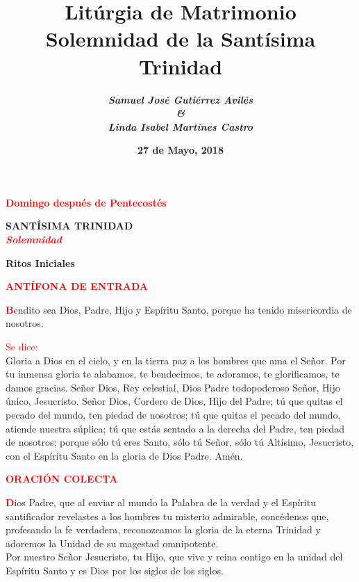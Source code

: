 \documentclass[12pt, letterpaper]{report}
\title{
  \Huge \bfseries Lit\'urgia de Matrimonio \\
  \large Solemnidad de la Sant\'isima Trinidad
}
\author{
  \Large \em \bfseries Samuel Jos\'e Guti\'errez Avil\'es \\
  \Large \em \bfseries \& \\
  \Large \em \bfseries Linda Isabel Mart\'ines Castro
}
\date{\bfseries 27 de Mayo, 2018}
\begin{document}
  \maketitle

  \begin{center}
    \Large {\bfseries \textcolor{red}{Domingo despu\'es de Pentecost\'es}}
  \end{center}

  \begin{center}
    \Huge {\bfseries SANT\'ISIMA TRINIDAD} \\
    \Large {\bfseries \em \textcolor{red}{Solemnidad}}
  \end{center}

  \begin{center}
    \Huge {\bfseries Ritos Iniciales}
  \end{center}

  \Large {\bfseries \textcolor{red}{ANT\'IFONA DE ENTRADA}}

  \lettrine[lines=2]{\bfseries \textcolor{red}{B}}{}\Large endito sea Dios, Padre, Hijo y Esp\'iritu Santo, porque ha tenido misericordia de nosotros.

  \Large {\textcolor{red}{Se dice:}}\\
  \Large Gloria a Dios en el cielo, y en la tierra paz a los hombres que ama el Señor. Por tu inmensa gloria te alabamos, te bendecimos, te adoramos, te glorificamos, te damos gracias. Señor Dios, Rey celestial, Dios Padre todopoderoso Señor, Hijo único, Jesucristo. Señor Dios, Cordero de Dios, Hijo del Padre; 
  tú que quitas el pecado del mundo, ten piedad de nosotros; 
  tú que quitas el pecado del mundo, atiende nuestra súplica; 
  tú que estás sentado a la derecha del Padre, ten piedad de nosotros;
  porque sólo tú eres Santo, sólo tú Señor, sólo tú Altísimo, Jesucristo,
  con el Espíritu Santo en la gloria de Dios Padre.
  Amén.

  \Large {\bfseries \textcolor{red}{ORACI\'ON COLECTA}}

  \Large \lettrine[lines=2]{\bfseries \textcolor{red}{D}}{}\Large ios Padre, que al enviar al mundo la Palabra de la verdad y el Esp\'iritu santificador revelastes a los hombres tu misterio admirable, conc\'edenos que, profesando la fe verdadera, reconozcamos la gloria de la eterna Trinidad y adoremos la Unidad de su magestad omnipotente.\\
  Por nuestro Se\~nor Jesucristo, tu Hijo, que vive y reina contigo en la unidad del Esp\'iritu Santo y es Dios por los siglos de los siglos.
\end{document}
